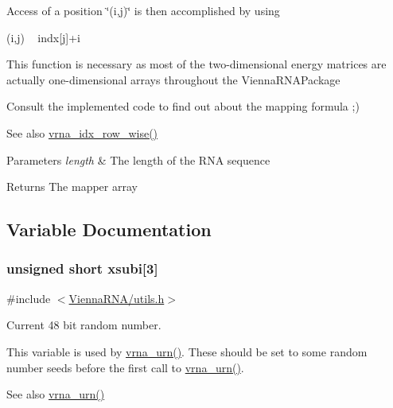 Access of a position \char`\"{}(i,j)\char`\"{} is then accomplished by using\begin{DoxyVerb}(i,j) ~ indx[j]+i \end{DoxyVerb}
 This function is necessary as most of the two-\/dimensional energy matrices are actually one-\/dimensional arrays throughout the Vienna\+R\+N\+A\+Package

Consult the implemented code to find out about the mapping formula ;)

\begin{DoxySeeAlso}{See also}
\hyperlink{group__utils_ga70b180e9ea764218a82647a1cd347445}{vrna\+\_\+idx\+\_\+row\+\_\+wise()} 
\end{DoxySeeAlso}

\begin{DoxyParams}{Parameters}
{\em length} & The length of the R\+NA sequence \\
\hline
\end{DoxyParams}
\begin{DoxyReturn}{Returns}
The mapper array 
\end{DoxyReturn}


\subsection{Variable Documentation}
\subsubsection[{\texorpdfstring{xsubi}{xsubi}}]{\setlength{\rightskip}{0pt plus 5cm}unsigned short xsubi\mbox{[}3\mbox{]}}\hypertarget{group__utils_gaf9a866c8417afda7368bbac939ab3c47}{}\label{group__utils_gaf9a866c8417afda7368bbac939ab3c47}


{\ttfamily \#include $<$\hyperlink{utils_8h}{Vienna\+R\+N\+A/utils.\+h}$>$}



Current 48 bit random number. 

This variable is used by \hyperlink{group__utils_ga384e256ebb295d04a14426179db0dd6e}{vrna\+\_\+urn()}. These should be set to some random number seeds before the first call to \hyperlink{group__utils_ga384e256ebb295d04a14426179db0dd6e}{vrna\+\_\+urn()}.

\begin{DoxySeeAlso}{See also}
\hyperlink{group__utils_ga384e256ebb295d04a14426179db0dd6e}{vrna\+\_\+urn()} 
\end{DoxySeeAlso}
